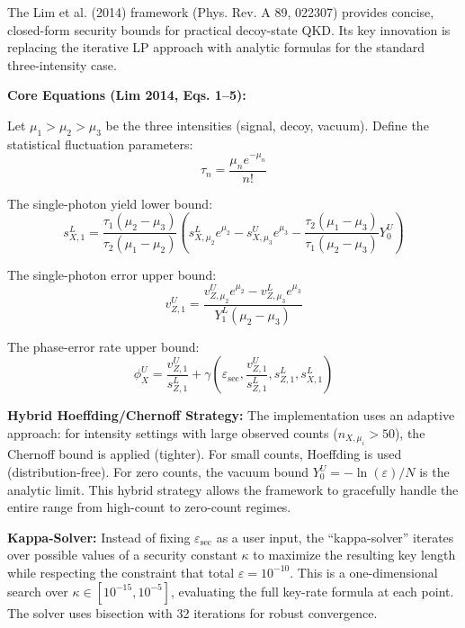 \documentclass[11pt,a4paper,oneside]{report}
\begin{document}
The Lim et al. (2014) framework (Phys. Rev. A 89, 022307) provides concise, closed-form security bounds for practical decoy-state QKD. Its key innovation is replacing the iterative LP approach with analytic formulas for the standard three-intensity case.

\textbf{Core Equations (Lim 2014, Eqs. 1–5):}

Let $\mu_1 > \mu_2 > \mu_3$ be the three intensities (signal, decoy, vacuum). Define the statistical fluctuation parameters:
\begin{equation}
\tau_n = \frac{\mu_n e^{-\mu_n}}{n!}
\end{equation}

The single-photon yield lower bound:
\begin{equation}
s_{X,1}^L = \frac{\tau_1(\mu_2 - \mu_3)}{\tau_2(\mu_1 - \mu_2)}\left( s_{X,\mu_2}^L e^{\mu_2} - s_{X,\mu_3}^U e^{\mu_3} - \frac{\tau_2(\mu_1 - \mu_3)}{\tau_1(\mu_2 - \mu_3)}Y_0^U \right)
\label{eq:lim_sx1l}
\end{equation}

The single-photon error upper bound:
\begin{equation}
v_{Z,1}^U = \frac{v_{Z,\mu_2}^U e^{\mu_2} - v_{Z,\mu_3}^L e^{\mu_3}}{Y_1^L (\mu_2 - \mu_3)}
\label{eq:lim_vz1u}
\end{equation}

The phase-error rate upper bound:
\begin{equation}
\phi_X^U = \frac{v_{Z,1}^U}{s_{Z,1}^L} + \gamma\left(\varepsilon_{\text{sec}}, \frac{v_{Z,1}^U}{s_{Z,1}^L}, s_{Z,1}^L, s_{X,1}^L\right)
\label{eq:lim_phi}
\end{equation}

\textbf{Hybrid Hoeffding/Chernoff Strategy:} The implementation uses an adaptive approach: for intensity settings with large observed counts ($n_{X,\mu_i} > 50$), the Chernoff bound is applied (tighter). For small counts, Hoeffding is used (distribution-free). For zero counts, the vacuum bound $Y_0^U = -\ln(\varepsilon)/N$ is the analytic limit. This hybrid strategy allows the framework to gracefully handle the entire range from high-count to zero-count regimes.

\textbf{Kappa-Solver:} Instead of fixing $\varepsilon_{\text{sec}}$ as a user input, the ``kappa-solver'' iterates over possible values of a security constant $\kappa$ to maximize the resulting key length while respecting the constraint that total $\varepsilon = 10^{-10}$. This is a one-dimensional search over $\kappa \in [10^{-15}, 10^{-5}]$, evaluating the full key-rate formula at each point. The solver uses bisection with 32 iterations for robust convergence.
\end{document}
